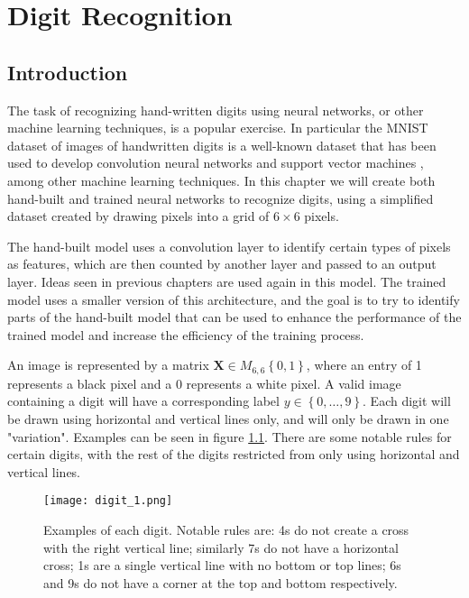 \documentclass{somasmsc}
\begin{document}
\chapter{Digit Recognition}

\section{Introduction}

The task of recognizing hand-written digits using neural networks, or other machine learning techniques, is a popular exercise. In particular the MNIST dataset of images of handwritten digits is a well-known dataset that has been used to develop convolution neural networks \citep{ciresan2011convolutional} and support vector machines \citep{platt1998using}, among other machine learning techniques. In this chapter we will create both hand-built and trained neural networks to recognize digits, using a simplified dataset created by drawing pixels into a grid of $6 \times 6$ pixels.

The hand-built model uses a convolution layer to identify certain types of pixels as features, which are then counted by another layer and passed to an output layer. Ideas seen in previous chapters are used again in this model. The trained model uses a smaller version of this architecture, and the goal is to try to identify parts of the hand-built model that can be used to enhance the performance of the trained model and increase the efficiency of the training process.

An image is represented by a matrix $\mathbf{X} \in M_{6,6}\left\{0,1\right\}$, where an entry of 1 represents a black pixel and a 0 represents a white pixel. A valid image containing a digit will have a corresponding label $y \in \left\{0, \dots, 9\right\}$. Each digit will be drawn using horizontal and vertical lines only, and will only be drawn in one "variation". Examples can be seen in figure \ref{digit:fig1}. There are some notable rules for certain digits, with the rest of the digits restricted from only using horizontal and vertical lines.

\begin{figure}[H]\label{digit:fig1}
\begin{center}
\texttt{[image: digit\_1.png]}
\end{center}
\caption{Examples of each digit. Notable rules are: 4s do not create a cross with the right vertical line; similarly 7s do not have a horizontal cross; 1s are a single vertical line with no bottom or top lines; 6s and 9s do not have a corner at the top and bottom respectively.}
\end{figure}
\end{document}
